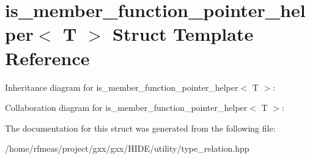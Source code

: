 \hypertarget{structis__member__function__pointer__helper}{}\section{is\+\_\+member\+\_\+function\+\_\+pointer\+\_\+helper$<$ T $>$ Struct Template Reference}
\label{structis__member__function__pointer__helper}


Inheritance diagram for is\+\_\+member\+\_\+function\+\_\+pointer\+\_\+helper$<$ T $>$\+:


Collaboration diagram for is\+\_\+member\+\_\+function\+\_\+pointer\+\_\+helper$<$ T $>$\+:


The documentation for this struct was generated from the following file\+:\begin{DoxyCompactItemize}
\item 
/home/rfmeas/project/gxx/gxx/\+H\+I\+D\+E/utility/type\+\_\+relation.\+hpp\end{DoxyCompactItemize}
